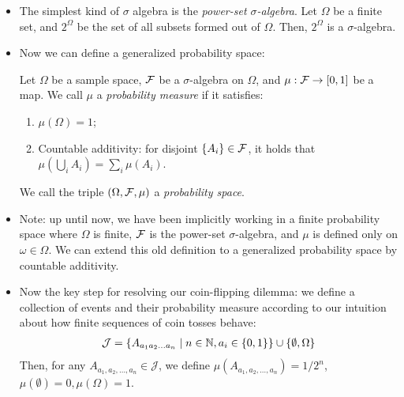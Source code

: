 \documentclass{tufte-handout}
\begin{document}
\begin{itemize}
  \item The simplest kind of $\sigma$ algebra is the \emph{power-set
  $\sigma$-algebra}. Let $\Omega$ be a finite set, and $2^\Omega$ be the set of
  all subsets formed out of $\Omega$. Then, $2^\Omega$ is a $\sigma$-algebra.

  \item Now we can define a generalized probability space:
  \begin{definition}
    Let $\Omega$ be a sample space, $\mathcal{F}$ be a $\sigma$-algebra on $\Omega$, and 
    $\mu : \mathcal{F} \rightarrow [0,1]$ be a map. We call $\mu$ a \emph{probability measure} 
    if it satisfies:
    \begin{enumerate}
      \item $\mu(\Omega) = 1$;
      \item Countable additivity: for disjoint $\{A_i\} \in \mathcal{F}$, it holds that 
      $\mu(\bigcup_i A_i) = \sum_i \mu(A_i)$.
    \end{enumerate}
    We call the triple $(\Omega, \mathcal{F}, \mu)$ a \emph{probability space}.
  \end{definition}

  \item Note: up until now, we have been implicitly working in a finite probability 
  space where $\Omega$ is finite, $\mathcal{F}$ is the power-set $\sigma$-algebra, and 
  $\mu$ is defined only on $\omega \in \Omega$. We can extend this old definition to a 
  generalized probability space by countable additivity.


  \item Now the key step for resolving our coin-flipping dilemma: we define a
  collection of events and their probability measure according to our intuition
  about how finite sequences of coin tosses behave:
  \begin{align}
    \mathcal{J} = \{A_{a_1a_2 \dots a_n} \mid n \in \mathbb{N}, a_i \in \{0, 1\} \} \cup \{\emptyset, \Omega\}
  \end{align}
  Then, for any $A_{a_1, a_2, \dots, a_n} \in \mathcal{J}$, we define $\mu(A_{a_1, a_2, \dots, a_n}) = 1/2^n$, 
  $\mu(\emptyset) = 0, \mu(\Omega) = 1$.


\end{itemize}
\end{document}
